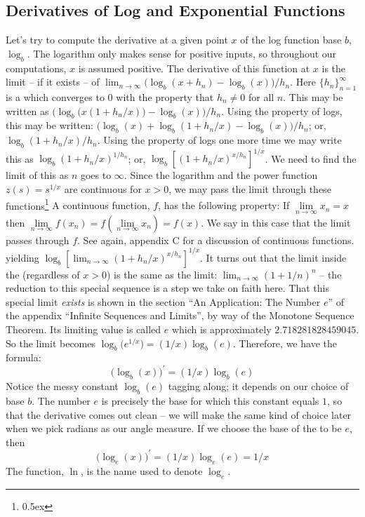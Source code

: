 \subsection{Derivatives of Log and Exponential Functions}
Let's try to compute the derivative at a given point $x$ of the log 
function base $b$, $\log_b$. The logarithm only makes sense for 
positive inputs, so 
throughout our computations, $x$ is assumed positive.
The derivative of this function at $x$ is the limit --
if it exists -- of $\lim_{n \rightarrow \infty} \bigl(\log_b(x+h_n) - \log_b(x)\bigr) / h_n$.
Here $\{h_n\}_{n=1}^\infty$
is a  which converges to $0$ with the property that $h_n \ne 0$ for all $n$.
This may be written as $\bigl(\log_b\bigl(x (1 + h_n/x)\bigr) - \log_b(x)\bigr) 
/ h_n$. Using 
the property of logs, this may be written: 
$\bigl( \log_b(x) + \log_b(1 + h_n/x) - \log_b(x) \bigr) / h_n$; or,
$\log_b(1 + h_n/x) / h_n$. Using the property of logs one more time we may write 
this as $\log_b(1 + h_n/x)^{1/h_n}$; or, 
$\log_b\left[(1 + h_n/x)^{x/h_n}\right]^{1/x}$. We need to find the limit of this  as
$n$ goes to $\infty$.
Since
the logarithm and the power function $z(s) = s^{1/x}$ are continuous for $x > 0$, we may pass the 
limit through these functions\footnote{\kern 0.5pt \raise 0.5ex \hbox{\ddag}}%
{A continuous function, $f$,
has the following property: If $\lim\limits_{n\rightarrow \infty} x_n = x$ then
$\lim\limits_{n\rightarrow \infty} f(x_n) = f(\lim\limits_{n\rightarrow \infty} x_n)
= f(x)$. We say in this case that the limit passes through $f$. See again, appendix C 
for a discussion of continuous functions.} yielding 
$\log_b\left[\lim_{n\rightarrow \infty}(1 + h_n/x)^{x/h_n}\right]^{1/x}$. It turns out that
the limit
inside the  (regardless of $x>0$)  is the same as the limit:
$\lim_{n \rightarrow \infty}(1 + 1/n)^n$ -- the reduction to this special
sequence is a step we take on faith here. That this special limit {\it
exists\/} is shown in the section ``An Application: The Number $e$'' of the
appendix ``Infinite Sequences and Limits'', by way of the Monotone Sequence
Theorem. Its limiting
value
is called $e$ which is approximately $2.718281828459045$. So the limit becomes
$\log_b\bigl(e^{1/x} \bigr)= (1/x)\log_b(e)$. Therefore, we have the formula:
$$
\bigl(\log_b(x) \bigr)^{\prime}= (1/x)\log_b(e)
$$
Notice the messy constant $\log_b(e)$ tagging along; it depends on our choice
of base $b$. The number $e$ is precisely the base for which this constant
equals $1$, so that the derivative comes out clean -- we will make the same
kind of choice later when we pick radians as our angle measure.
If we choose the base of the  to be $e$, then
$$
\bigl(\log_e(x)\bigr)^{\prime} = (1/x)\log_e(e) = 1/x
$$
The function, $\ln$, is the name used to denote $\log_e$. 

